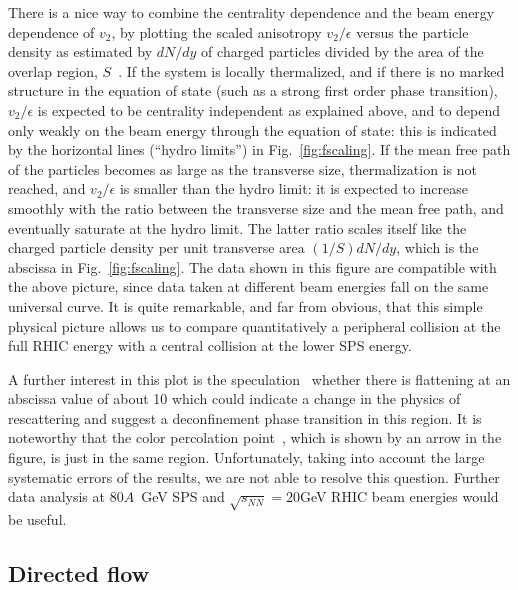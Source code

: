 \documentclass[aps,prc,superscriptaddress,showpacs,floatfix,nofootinbib]{revtex4}
\begin{document}
There is a nice way to combine the centrality dependence and the beam
energy dependence of $v_2$, by plotting the scaled anisotropy
$v_2/\epsilon$ versus the particle density as estimated by $dN/dy$ of
charged particles divided by the area of the overlap region,
$S$~\cite{Voloshin:1999gs,Voloshin:QM02}.
If the system is locally thermalized, and if there is no marked
structure in the equation of state (such as a strong first order phase
transition), $v_2/\epsilon$ is expected to be centrality independent
as explained above, and to depend only weakly on the beam energy
through the equation of state: this is indicated by the horizontal
lines (``hydro limits'') in Fig.~\ref{fig:fscaling}.  If the mean free
path of the particles becomes as large as the transverse size,
thermalization is not reached, and $v_2/\epsilon$ is smaller than the
hydro limit: it is expected to increase smoothly with the ratio
between the transverse size and the mean free path, and eventually
saturate at the hydro limit.  The latter ratio scales itself like the
charged particle density per unit transverse area $(1/S)dN/dy$, which
is the abscissa in Fig.~\ref{fig:fscaling}.  The data shown in this
figure are compatible with the above picture, since data taken at
different beam energies fall on the same universal curve.  It is quite
remarkable, and far from obvious, that this simple physical picture
allows us to compare quantitatively a peripheral collision at the full
RHIC energy with a central collision at the lower SPS energy.

A further interest in this plot is the
speculation~\cite{Voloshin:1999gs} whether there is flattening at an
abscissa value of about 10 which could indicate a change in the
physics of rescattering and suggest a deconfinement phase transition
in this region.  It is noteworthy that the color percolation
point~\cite{Satz:QM02}, which is shown by an arrow in the figure, is
just in the same region.  
Unfortunately, taking into account the large systematic errors of the
results, we are not able to resolve this question. Further data
analysis at 80$A$~GeV SPS and $\sqrt{s_{NN}}=20 $GeV RHIC
beam energies would be useful.


\subsection{Directed flow}
\end{document}
